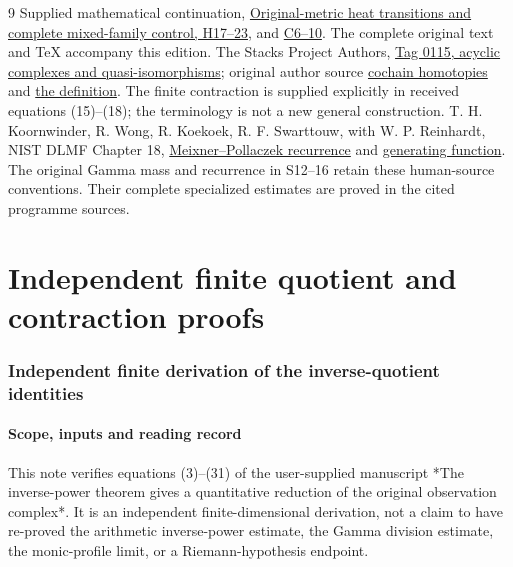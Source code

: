 \documentclass[11pt]{article}
\begin{document}
\begin{thebibliography}{9}
 Supplied mathematical continuation,
\href{https://github.com/KokunoYumeto/zeta-function-research-reader/blob/78ed538f7c00121ab66e9e8adbefc0612c118db8/workbenches/splitzero-tandem/continuations/20260921-mixed-family-proof-source/COMPLETE_MIXED_SOURCE_PROOFS.tex#L129}{Original-metric heat transitions and complete mixed-family control, H17--23},
and \href{https://github.com/KokunoYumeto/zeta-function-research-reader/blob/78ed538f7c00121ab66e9e8adbefc0612c118db8/workbenches/splitzero-tandem/continuations/20260921-mixed-family-proof-source/COMPLETE_MIXED_SOURCE_PROOFS.tex#L528}{C6--10}. The complete original text and TeX accompany this edition.
 The Stacks Project Authors,
\href{https://stacks.math.columbia.edu/tag/0115}{Tag 0115, acyclic complexes and quasi-isomorphisms};
original author source
\href{https://github.com/stacks/stacks-project/blob/a04446e57ec1fbc252a871afcec7752fb2807b14/homology.tex#L3057}{cochain homotopies}
and \href{https://github.com/stacks/stacks-project/blob/a04446e57ec1fbc252a871afcec7752fb2807b14/homology.tex#L3160}{the definition}.
The finite contraction is supplied explicitly in received equations
(15)--(18); the terminology is not a new general construction.
 T. H. Koornwinder, R. Wong, R. Koekoek,
R. F. Swarttouw, with W. P. Reinhardt, NIST DLMF Chapter 18,
\href{https://dlmf.nist.gov/18.22.E8}{Meixner--Pollaczek recurrence}
and \href{https://dlmf.nist.gov/18.23.E7}{generating function}.
The original Gamma mass and recurrence in S12--16 retain these
human-source conventions. Their complete specialized estimates
are proved in the cited programme sources.
\end{thebibliography}
\clearpage\part{Independent finite quotient and contraction proofs}
\section{Independent finite derivation of the inverse-quotient identities}\label{independent-finite-derivation-of-the-inverse-quotient-identities}

\subsection{Scope, inputs and reading record}\label{scope-inputs-and-reading-record}

This note verifies equations (3)--(31) of the user-supplied manuscript *The inverse-power theorem gives a quantitative reduction of the original observation complex*. It is an independent finite-dimensional derivation, not a claim to have re-proved the arithmetic inverse-power estimate, the Gamma division estimate, the monic-profile limit, or a Riemann-hypothesis endpoint.
\end{document}
